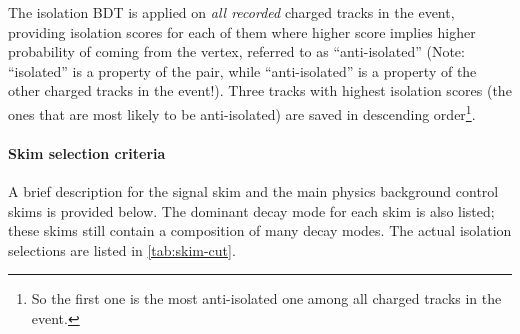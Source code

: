 The isolation BDT is applied on \emph{all recorded} charged tracks in the event,
providing isolation scores for each of them where higher score implies higher
probability of coming from the \B vertex,
referred to as ``anti-isolated''
(Note: ``isolated'' is a property of the \DXmu pair,
while ``anti-isolated'' is a property of the other charged tracks in the
event!).
Three tracks with highest isolation scores
(the ones that are most likely to be anti-isolated)
are saved in descending order\footnote{
    So the first one is the most anti-isolated one among all charged tracks
    in the event.
}.


\paragraph{Skim selection criteria}
A brief description for the signal skim and the main physics background
control skims is provided below.
The dominant decay mode for each skim is also listed; these skims still contain
a composition of many decay modes.
The actual isolation selections are listed in \cref{tab:skim-cut}.

